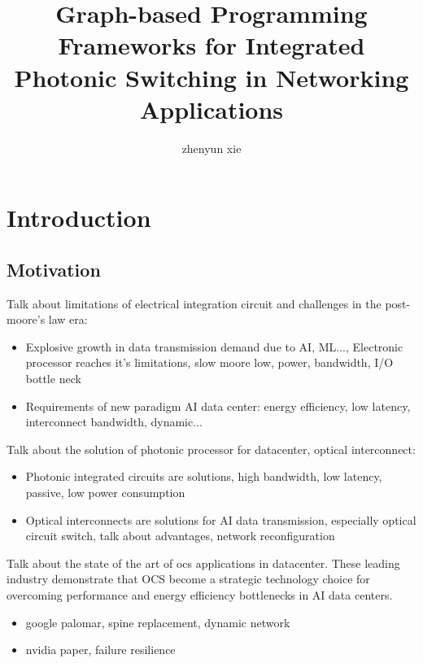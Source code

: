 \documentclass{article}
\begin{document}
\title{Graph-based Programming Frameworks for Integrated Photonic Switching in Networking Applications}
\author{zhenyun xie}
\maketitle

\section{Introduction}

\subsection*{Motivation}
Talk about limitations of electrical integration circuit and challenges in the post-moore's law era:
\begin{itemize}
    \item Explosive growth in data transmission demand due to AI, ML..., Electronic processor reaches it's limitations, slow moore low, power, bandwidth, I/O bottle neck
    \item Requirements of new paradigm AI data center: energy efficiency, low latency, interconnect bandwidth, dynamic...
\end{itemize}

Talk about the solution of photonic processor for datacenter, optical interconnect:
\begin{itemize}
    \item Photonic integrated circuits are solutions, high bandwidth, low latency, passive, low power consumption
    \item Optical interconnects are solutions for AI data transmission, especially optical circuit switch, talk about advantages, network reconfiguration
\end{itemize}

Talk about the state of the art of ocs applications in datacenter.
These leading industry demonstrate that OCS become a strategic technology choice for overcoming performance and energy efficiency bottlenecks in AI data centers.
\begin{itemize}
    \item google palomar, spine replacement, dynamic network
    \item nvidia paper, failure resilience
\end{itemize}
\end{document}
